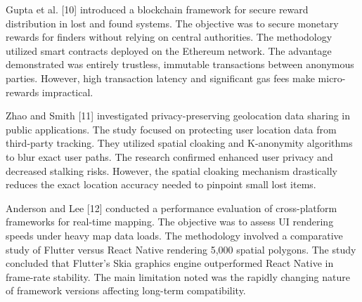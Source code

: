 \documentclass[12pt,a4paper]{report}
\begin{document}
\vspace{0.4cm}

Gupta et al. [10] introduced a blockchain framework for secure reward distribution in lost and found systems. The objective was to secure monetary rewards for finders without relying on central authorities. The methodology utilized smart contracts deployed on the Ethereum network. The advantage demonstrated was entirely trustless, immutable transactions between anonymous parties. However, high transaction latency and significant gas fees make micro-rewards impractical.

\vspace{0.4cm}

Zhao and Smith [11] investigated privacy-preserving geolocation data sharing in public applications. The study focused on protecting user location data from third-party tracking. They utilized spatial cloaking and K-anonymity algorithms to blur exact user paths. The research confirmed enhanced user privacy and decreased stalking risks. However, the spatial cloaking mechanism drastically reduces the exact location accuracy needed to pinpoint small lost items.

\vspace{0.4cm}

Anderson and Lee [12] conducted a performance evaluation of cross-platform frameworks for real-time mapping. The objective was to assess UI rendering speeds under heavy map data loads. The methodology involved a comparative study of Flutter versus React Native rendering 5,000 spatial polygons. The study concluded that Flutter's Skia graphics engine outperformed React Native in frame-rate stability. The main limitation noted was the rapidly changing nature of framework versions affecting long-term compatibility.

\newpage %
\end{document}
